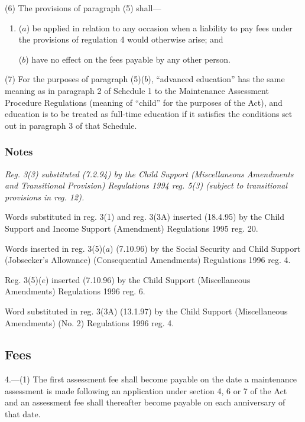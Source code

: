 \documentclass[a4paper]{article}
\newcommand\amendment[1]{\subsubsection*{Notes}{\itshape\frenchspacing\footnotesize #1 \par}}
\begin{document}
(6) The provisions of paragraph (5) shall—
\begin{enumerate}\item[]
($a$) be applied in relation to any occasion when a liability to pay fees under the provisions of regulation 4 would otherwise arise; and

($b$) have no effect on the fees payable by any other person.
\end{enumerate}

(7) For the purposes of paragraph (5)($b$), “advanced education” has the same meaning as in paragraph 2 of Schedule 1 to the Maintenance Assessment Procedure Regulations (meaning of “child” for the purposes of the Act), and education is to be treated as full-time education if it satisfies the conditions set out in paragraph 3 of that Schedule.

\amendment{
Reg. 3(3) substituted (7.2.94) by the Child Support (Miscellaneous Amendments and Transitional Provision) Regulations 1994 reg. 5(3) (subject to transitional provisions in reg. 12).

Words substituted in reg. 3(1) and reg. 3(3A) inserted (18.4.95) by the Child Support and Income Support (Amendment) Regulations 1995 reg. 20.

Words inserted in reg. 3(5)($a$) (7.10.96) by the Social Security and Child Support (Jobseeker's Allowance) (Consequential Amendments) Regulations 1996 reg. 4.

Reg. 3(5)($e$) inserted (7.10.96) by the Child Support (Miscellaneous Amendments) Regulations 1996 reg. 6.

Word substituted in reg. 3(3A) (13.1.97) by the Child Support (Miscellaneous Amendments) (No. 2) Regulations 1996 reg. 4.
}

\subsection[4. Fees]{Fees}

4.—(1) The first assessment fee shall become payable on the date a maintenance assessment is made following an application under section 4, 6 or 7 of the Act and an assessment fee shall thereafter become payable on each anniversary of that date.

\end{document}
